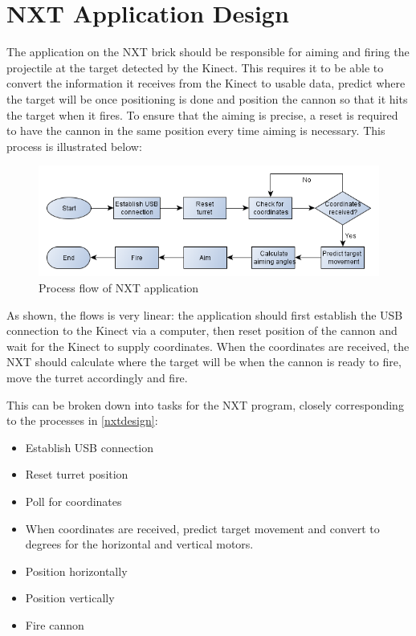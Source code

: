 \section{NXT Application Design}

\label{nxtdesign}

The application on the NXT brick should be responsible for aiming and firing the projectile at the target detected by the Kinect. This requires it to be able to convert the information it receives from the Kinect to usable data, predict where the target will be once positioning is done and position the cannon so that it hits the target when it fires. To ensure that the aiming is precise, a reset is required to have the cannon in the same position every time aiming is necessary. This process is illustrated below:

\begin{figure}[hbtp]
	\includegraphics[scale=0.5]{img/nxtdesign.png}
	\caption{Process flow of NXT application}
	\label{nxtdesign}
\end{figure}

As shown, the flows is very linear: the application should first establish the USB connection to the Kinect via a computer, then reset position of the cannon and wait for the Kinect to supply coordinates. When the coordinates are received, the NXT should calculate where the target will be when the cannon is ready to fire, move the turret accordingly and fire.

This can be broken down into tasks for the NXT program, closely corresponding to the processes in \autoref{nxtdesign}:
\begin{itemize}
	\item Establish USB connection
	\item Reset turret position
	\item Poll for coordinates
	\item When coordinates are received, predict target movement and convert to degrees for the horizontal and vertical motors.
	\item Position horizontally
	\item Position vertically
	\item Fire cannon
\end{itemize}

